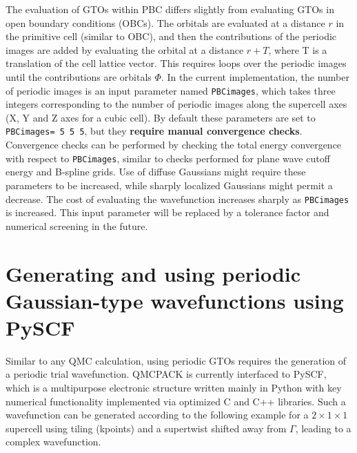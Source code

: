 The evaluation of GTOs within PBC differs slightly from evaluating
GTOs in open boundary conditions (OBCs).  The orbitals are evaluated at
a distance $r$ in the primitive cell (similar to OBC), and then the
contributions of the periodic images are added by evaluating the
orbital at a distance $r+T$, where T is a translation of the cell
lattice vector. This requires loops over the periodic images until the
contributions are orbitals $\Phi$. In the current implementation, the
number of periodic images is an input parameter named
\texttt{PBCimages}, which takes three integers corresponding to the
number of periodic images along the supercell axes (X, Y and Z axes
for a cubic cell). By default these parameters are set to
\texttt{PBCimages= 5 5 5}, but they \textbf{require manual convergence
  checks}. Convergence checks can be performed by checking the total
energy convergence with respect to \texttt{PBCimages}, similar to checks
performed for plane wave cutoff energy and B-spline grids. Use of
diffuse Gaussians might require these parameters to be increased, while
sharply localized Gaussians might permit a decrease. The cost of
evaluating the wavefunction increases sharply as \texttt{PBCimages} is
increased. This input parameter will be replaced by a tolerance
factor and numerical screening in the future.

\section{Generating and using periodic Gaussian-type wavefunctions
  using PySCF}

Similar to any QMC calculation, using periodic GTOs requires the
generation of a periodic trial wavefunction. QMCPACK is currently
interfaced to PySCF, which is a multipurpose electronic structure
written mainly in Python with key numerical functionality implemented
via optimized C and C++ libraries\cite{Sun2018}. Such a wavefunction
can be generated according to the following example for a $2 \times 1 \times 1$ supercell using tiling (kpoints) and a supertwist shifted away from $\Gamma$, leading to a complex wavefunction.  

